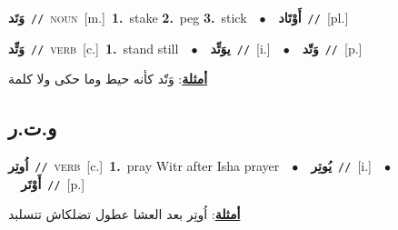 \documentclass[10pt,a4paper,twoside]{article} %
\begin{document}
\begin{multicols}{2}
{{{{\setlength\topsep{0pt}\textbf{\foreignlanguage{arabic}{وَتَد}}\ {\color{gray}\texttt{//}\color{black}}\ \textsc{noun}\ [m.]\ \textbf{1.}~stake  \textbf{2.}~peg  \textbf{3.}~stick\ \ $\bullet$\ \ \setlength\topsep{0pt}\textbf{\foreignlanguage{arabic}{أَوْتَاد}}\ {\color{gray}\texttt{//}\color{black}}\ [pl.]\ 

{\setlength\topsep{0pt}\textbf{\foreignlanguage{arabic}{وَتِّد}}\ {\color{gray}\texttt{//}\color{black}}\ \textsc{verb}\ [c.]\ \textbf{1.}~stand still\ \ $\bullet$\ \ \setlength\topsep{0pt}\textbf{\foreignlanguage{arabic}{يوَتِّد}}\ {\color{gray}\texttt{//}\color{black}}\ [i.]\ \ $\bullet$\ \ \setlength\topsep{0pt}\textbf{\foreignlanguage{arabic}{وَتّد}}\ {\color{gray}\texttt{//}\color{black}}\ [p.]\  \begin{flushright}\color{gray}\foreignlanguage{arabic}{\textbf{\underline{\foreignlanguage{arabic}{أمثلة}}}: وَتّد كأنه حيط وما حكى ولا كلمة}\end{flushright}\color{black}} \vspace{2mm}

\vspace{-3mm}
\subsection*{\color{blue}\foreignlanguage{arabic}{و.ت.ر}\color{blue}{}} 

{\setlength\topsep{0pt}\textbf{\foreignlanguage{arabic}{اُوتِر}}\ {\color{gray}\texttt{//}\color{black}}\ \textsc{verb}\ [c.]\ \textbf{1.}~pray Witr after Isha prayer\ \ $\bullet$\ \ \setlength\topsep{0pt}\textbf{\foreignlanguage{arabic}{يُوتِر}}\ {\color{gray}\texttt{//}\color{black}}\ [i.]\ \ $\bullet$\ \ \setlength\topsep{0pt}\textbf{\foreignlanguage{arabic}{أَوْتَر}}\ {\color{gray}\texttt{//}\color{black}}\ [p.]\  \begin{flushright}\color{gray}\foreignlanguage{arabic}{\textbf{\underline{\foreignlanguage{arabic}{أمثلة}}}: اُوتِر بعد العشا عطول تضلكاش تتسلبد}\end{flushright}\color{black}} \vspace{2mm}

}}}}
\end{multicols}
\end{document}
